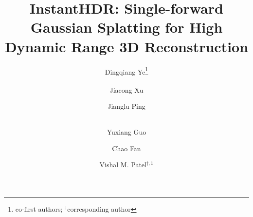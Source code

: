 \documentclass[runningheads]{llncs}
\newcommand{\repeatthanks}{\textsuperscript{\thefootnote}}
\begin{document}
\title{InstantHDR: Single-forward Gaussian Splatting for High Dynamic Range 3D Reconstruction}


\author{Dingqiang Ye\thanks{co-first authors; $^{\dagger}$corresponding author} \and
Jiacong Xu\repeatthanks{}\and
Jianglu Ping\and \\
Yuxiang Guo\and
Chao Fan\and
Vishal M. Patel$^{\dagger,1}$
}





\maketitle
\end{document}
